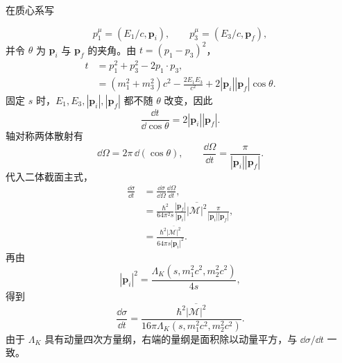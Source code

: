 \begin{derivation}
在质心系写

\begin{equation*}
 p_1^\mu=(E_1/c,\mathbf p_i),
 \qquad
 p_3^\mu=(E_3/c,\mathbf p_f),
\end{equation*}
并令 $\theta$ 为 $\mathbf p_i$ 与 $\mathbf p_f$ 的夹角。由 $t=(p_1-p_3)^2$，
\begin{align*}
 t
 &=p_1^2+p_3^2-2p_1\!\cdot p_3,\\
 &=(m_1^2+m_3^2)c^2
 -\frac{2E_1E_3}{c^2}
 +2|\mathbf p_i||\mathbf p_f|\cos\theta.
 \end{align*}
固定 $s$ 时，$E_1,E_3,|\mathbf p_i|,|\mathbf p_f|$ 都不随 $\theta$ 改变，因此
\begin{equation*}
 \frac{\dd t}{\dd\cos\theta}
 =2|\mathbf p_i||\mathbf p_f|.
\end{equation*}
轴对称两体散射有
\begin{equation*}
 \dd\Omega=2\pi\,\dd(\cos\theta),
 \qquad
 \frac{\dd\Omega}{\dd t}
 =\frac{\pi}{|\mathbf p_i||\mathbf p_f|}.
\end{equation*}
代入二体截面主式，
\begin{align*}
 \frac{\dd\sigma}{\dd t}
 &=\frac{\dd\sigma}{\dd\Omega}
 \frac{\dd\Omega}{\dd t},\\
 &=\frac{\hbar^2}{64\pi^2s}
 \frac{|\mathbf p_f|}{|\mathbf p_i|}
 \overline{|\mathcal M|^2}
 \frac{\pi}{|\mathbf p_i||\mathbf p_f|},\\
 &=\frac{\hbar^2\overline{|\mathcal M|^2}}
 {64\pi s|\mathbf p_i|^2}.
\end{align*}
再由 
\begin{equation*}
 |\mathbf p_i|^2
 =\frac{\Lambda_K(s,m_1^2c^2,m_2^2c^2)}{4s},
\end{equation*}
得到
\begin{equation*}
 {
 \frac{\dd\sigma}{\dd t}
 =\frac{\hbar^2\overline{|\mathcal M|^2}}
 {16\pi\Lambda_K(s,m_1^2c^2,m_2^2c^2)}.}
 \end{equation*}
由于 $\Lambda_K$ 具有动量四次方量纲，右端的量纲是面积除以动量平方，与 $\dd\sigma/\dd t$ 一致。
\end{derivation}

